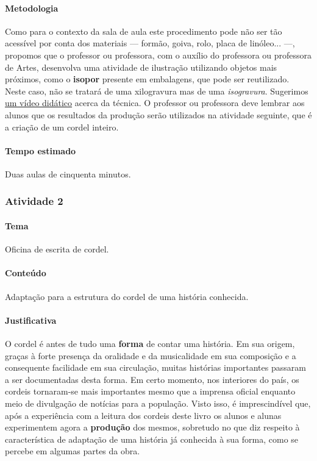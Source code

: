 \documentclass[11pt]{extarticle}
\begin{document}

\paragraph{Metodologia} Como para o contexto da sala de aula este procedimento pode não ser tão
acessível por conta dos materiais --- formão, goiva, rolo, placa de linóleo... ---,
propomos que o professor ou professora, com o auxílio do professora ou professora
de Artes, desenvolva uma atividade de ilustração utilizando objetos mais 
próximos, como o \textbf{isopor} presente em embalagens, que pode ser reutilizado.
Neste caso, não se tratará de uma xilogravura mas de uma \textit{isogravura}.
Sugerimos \href{https://www.youtube.com/watch?v=8sq9Qq-wrls}{um vídeo didático}
acerca da técnica. O professor ou
professora deve lembrar aos alunos que os resultados da produção serão utilizados
na atividade seguinte, que é a criação de um cordel inteiro. 


\paragraph{Tempo estimado} Duas aulas de cinquenta minutos.


\subsubsection{Atividade 2}


\paragraph{Tema} Oficina de escrita de cordel.


\paragraph{Conteúdo} Adaptação para a estrutura do cordel
de uma história conhecida.

\paragraph{Justificativa} O cordel é antes de tudo uma \textbf{forma} 
de contar uma história. Em sua origem, graças à forte presença
da oralidade e da musicalidade em sua composição e a consequente
facilidade em sua circulação, muitas histórias importantes passaram
a ser documentadas desta forma. Em certo momento, nos interiores 
do país, os cordeis tornaram-se mais importantes mesmo que a imprensa
oficial enquanto meio de divulgação de notícias para a população. 
Visto isso, é imprescindível que, após a experiência com a leitura dos
cordeis deste livro os alunos e alunas experimentem agora a \textbf{produção}
dos mesmos, sobretudo no que diz respeito à característica de adaptação 
de uma história já conhecida à sua forma, como se percebe em algumas
partes da obra.
\end{document}
